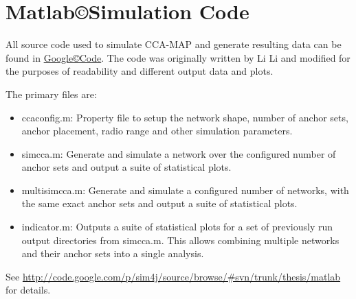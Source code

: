 \chapter{Matlab\copyright Simulation Code}
\label{AppendixA}

All source code used to simulate CCA-MAP and generate resulting data can be found in \href{http://code.google.com}{Google\copyright Code}.  The code was originally written by Li Li and modified for the purposes of readability and different output data and plots.

The primary files are:
\begin{itemize}
  \item ccaconfig.m: Property file to setup the network shape, number of anchor sets, anchor placement, radio range and other simulation parameters.
  \item simcca.m: Generate and simulate a network over the configured number of anchor sets and output a suite of statistical plots.
  \item multisimcca.m: Generate and simulate a configured number of networks, with the same exact anchor sets and output a suite of statistical plots.
  \item indicator.m: Outputs a suite of statistical plots for a set of previously run output directories from simcca.m.  This allows combining multiple networks and their anchor sets into a single analysis.
\end{itemize}

See \url{http://code.google.com/p/sim4j/source/browse/#svn/trunk/thesis/matlab} for details.

